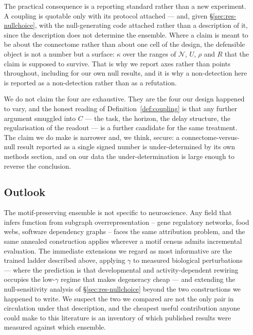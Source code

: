 The practical consequence is a reporting standard rather than a new experiment. A
coupling is quotable only with its protocol attached --- and, given
\S\ref{sec:res-nullchoice}, with the null-generating code attached rather than a
description of it, since the description does not determine the ensemble. Where a claim
is meant to be about the connectome rather than about one cell of the design, the
defensible object is not a number but a surface: $\kappa$ over the ranges of
$\mathcal{N}$, $U$, $\rho$ and $R$ that the claim is supposed to survive. That is
why we report axes rather than points throughout, including for our own null results,
and it is why a non-detection here is reported as a non-detection rather than as a
refutation.

We do not claim the four are exhaustive. They are the four our design happened to vary,
and the honest reading of Definition~\ref{def:coupling} is that any further argument
smuggled into $C$ --- the task, the horizon, the delay structure, the regularisation of
the readout --- is a further candidate for the same treatment. The claim we do make is
narrower and, we think, secure: a connectome-versus-null result reported as a single
signed number is under-determined by its own methods section, and on our data the
under-determination is large enough to reverse the conclusion.

\subsection{Outlook}

The motif-preserving ensemble is not specific to neuroscience. Any field that infers
function from subgraph overrepresentation -- gene regulatory networks, food webs,
software dependency graphs -- faces the same attribution problem, and the same annealed
construction applies wherever a motif census admits incremental evaluation. The
immediate extensions we regard as most informative are the trained ladder described above,
applying $\gamma$ to measured biological perturbations --- where the prediction is that
developmental and activity-dependent rewiring occupies the low-$\gamma$ regime that makes
degeneracy cheap --- and extending the null-sensitivity analysis of
\S\ref{sec:res-nullchoice} beyond the two constructions we happened to write. We suspect
the two we compared are not the only pair in circulation under that description, and the
cheapest useful contribution anyone could make to this literature is an inventory of
which published results were measured against which ensemble.
